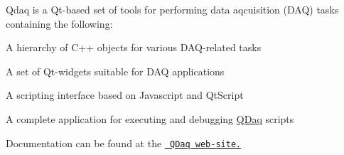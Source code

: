 Qdaq is a Qt-\/based set of tools for performing data aqcuisition (D\+AQ) tasks containing the following\+:


\begin{DoxyItemize}
\item A hierarchy of C++ objects for various D\+A\+Q-\/related tasks
\item A set of Qt-\/widgets suitable for D\+AQ applications
\item A scripting interface based on Javascript and Qt\+Script
\item A complete application for executing and debugging \mbox{\hyperlink{namespace_q_daq}{Q\+Daq}} scripts
\end{DoxyItemize}

Documentation can be found at the \href{https://fusion.ipta.demokritos.gr/qdaq}{\texttt{ Q\+Daq web-\/site.}} 